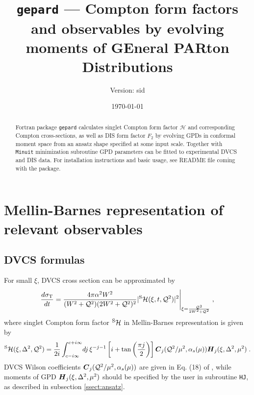 \documentclass[12pt]{article}
\begin{document}
\title{\texttt{gepard} --- Compton form factors and observables
                            by evolving moments of GEneral PARton Distributions}
\author{Version: sid}
\date{\today}
\maketitle

\begin{abstract}
Fortran package \texttt{gepard} calculates singlet Compton form factor
$\mathcal{H}$ and corresponding Compton cross-sections, as well as
DIS form factor $F_2$ by evolving GPDs in conformal moment space from an ansatz shape
specified at some input scale.  Together
with \texttt{Minuit} minimization subroutine GPD parameters can be fitted to
experimental DVCS and DIS data. For installation instructions and
basic usage, see README file coming with the package.
\end{abstract}

\tableofcontents
\clearpage

\section{Mellin-Barnes representation of relevant observables}

\subsection{DVCS formulas}  

For small $\xi$, DVCS cross section can be approximated by 
\begin{equation}
\frac{d \sigma_{\rm T}}{d t} = \frac{4 \pi \alpha^2 W^2}{(W^2 + \mathcal{Q}^2)
(2 W^2 + \mathcal{Q}^2)^2} | ^{\rm S}\mathcal{H}(\xi, t, \mathcal{Q}^2)|^2 \Bigg|_{\xi
= \frac{\mathcal{Q}^2}{2 W^2 + \mathcal{Q}^2}} \;,
\label{eq:parsigma}
\end{equation}
where singlet Compton form factor $^{\rm S}\mathcal{H}$ in Mellin-Barnes representation is given by
\begin{equation}
{^{\rm S}{\cal H}}(\xi,\Delta^2,{\cal Q}^2)
= \frac{1}{2i}\int_{c-i \infty}^{c+ i \infty}\!
dj\,\xi^{-j-1} \left[i + \tan \left(\frac{\pi j}{2}\right) \right]
\mbox{\boldmath $C$}_{j}({\cal Q}^2/\mu^2,\alpha_s(\mu)) 
\mbox{\boldmath $H$}_{j} (\xi,\Delta^2,\mu^2) \;.
\label{eq:CFF}
\end{equation}
DVCS Wilson coefficients $\mbox{\boldmath $C$}_{j}({\cal Q}^2/\mu^2,\alpha_s(\mu))$
are given in Eq. (18) of \cite{Kumericki:2006xx}, while moments of
GPD $\mbox{\boldmath $H$}_{j} (\xi,\Delta^2,\mu^2)$ should be specified
by the user in subroutine \texttt{HJ}, as described in subsection \ref{ssect:ansatz}.
\end{document}
